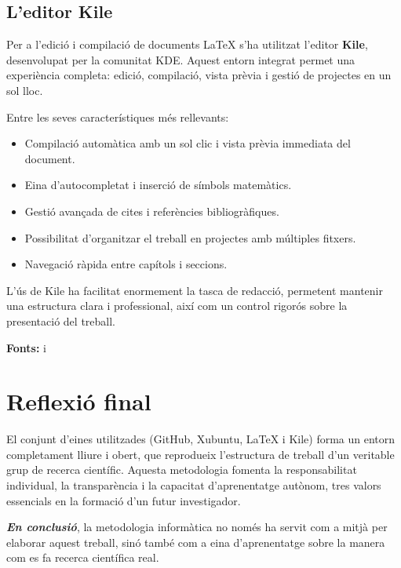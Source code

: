 \subsection{L’editor Kile}
Per a l’edició i compilació de documents LaTeX s’ha utilitzat l’editor \textbf{Kile}, desenvolupat per la comunitat KDE. Aquest entorn integrat permet una experiència completa: edició, compilació, vista prèvia i gestió de projectes en un sol lloc.

Entre les seves característiques més rellevants:
\begin{itemize}
  \item Compilació automàtica amb un sol clic i vista prèvia immediata del document.
  \item Eina d’autocompletat i inserció de símbols matemàtics.
  \item Gestió avançada de cites i referències bibliogràfiques.
  \item Possibilitat d’organitzar el treball en projectes amb múltiples fitxers.
  \item Navegació ràpida entre capítols i seccions.
\end{itemize}

L’ús de Kile ha facilitat enormement la tasca de redacció, permetent mantenir una estructura clara i professional, així com un control rigorós sobre la presentació del treball.

\textbf{Fonts:} \cite{A5} i~\cite{kile}

\section{Reflexió final}
El conjunt d’eines utilitzades (GitHub, Xubuntu, LaTeX i Kile) forma un entorn completament lliure i obert, que reprodueix l’estructura de treball d’un veritable grup de recerca científic. Aquesta metodologia fomenta la responsabilitat individual, la transparència i la capacitat d’aprenentatge autònom, tres valors essencials en la formació d’un futur investigador.

\textit{\textbf{En conclusió}}, la metodologia informàtica no només ha servit com a mitjà per elaborar aquest treball, sinó també com a eina d’aprenentatge sobre la manera com es fa recerca científica real.
